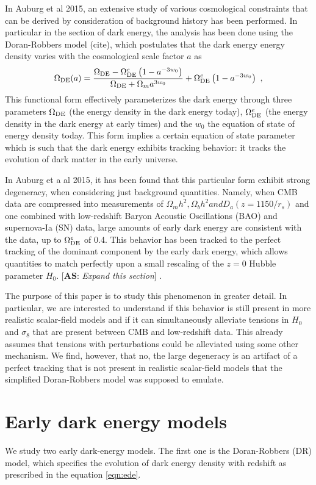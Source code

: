 \documentclass[preprintnumbers,amsmath,amssymb,prd,superscriptaddress,notitlepag
e, twocolumn]{revtex4-1}
\newcommand{\OmegaDE}{\Omega_{\rm DE}}
\def\as#1{[\textbf{AS}: \textit{#1}] }
\begin{document}
 In Auburg et al 2015, an extensive study of various cosmological
 constraints that can be derived by consideration of background history
 has been performed. In particular in the section of dark energy, the
 analysis has been done using the Doran-Robbers model (cite), which
 postulates that the dark energy energy density varies with the
 cosmological scale factor $a$ as
 \begin{equation}
\OmegaDE(a) = {\OmegaDE - \OmegaDE^e\left(1-a^{-3w_0}\right)
               \over \OmegaDE + \Omega_m a^{3w_0}}
			   + \OmegaDE^e\left(1-a^{-3w_0}\right)~,
 \label{eqn:ede}
 \end{equation}
 This functional form effectively parameterizes the dark energy
 through three parameters $\OmegaDE$ (the energy density in the dark
 energy today), $\OmegaDE^e$ (the energy density in the dark energy at
 early times) and the $w_0$ the equation of state of energy density
 today. This form implies a certain equation of state parameter which
 is such that the dark energy exhibits tracking behavior: it tracks
 the evolution of dark matter in the early universe.

 In Auburg et a al 2015, it has been found that this particular form
 exhibit strong degeneracy, when considering just background
 quantities. Namely, when CMB data are compressed into measurements of
 $\Omega_mh^2, \Omega_bh^2 and D_a(z=1150/r_s)$ and one combined with
 low-redshift Baryon Acoustic Oscillations (BAO) and supernova-Ia (SN)
 data, large amounts of early dark energy are consistent with the
 data, up to $\OmegaDE^e$ of 0.4. This behavior has been tracked to
 the perfect tracking of the dominant component by the early dark
 energy, which allows quantities to match perfectly upon a small
 rescaling of the $z=0$ Hubble parameter $H_0$. \as{Expand this
   section}. 

 The purpose of this paper is to study this phenomenon in greater
 detail. In particular, we are interested to understand if this
 behavior is still present in more realistic scalar-field models and
 if it can simultaneously alleviate tensions in $H_0$ and
 $\sigma_8$ that are present between CMB and low-redshift data. This
 already assumes that tensions with perturbations could be alleviated
 using some other mechanism. We find, however, that no, the large
 degeneracy is an artifact of a perfect tracking that is not present
 in realistic scalar-field models that the simplified Doran-Robbers
 model was supposed to emulate.

 \section{Early dark energy models}
 We study two early dark-energy models. The first one is the
 Doran-Robbers (DR) model, which specifies the evolution of dark
 energy density with redshift as prescribed in the equation
 \ref{eqn:ede}.
\end{document}
